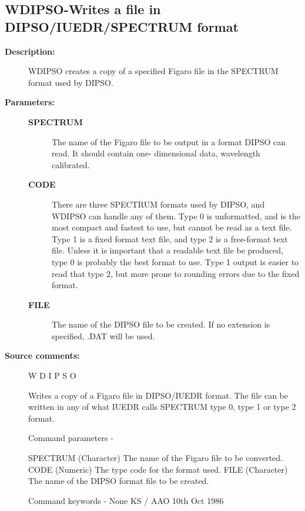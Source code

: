 \subsection{WDIPSO-\label{WDIPSO}Writes a file in DIPSO/IUEDR/SPECTRUM format}
\begin{description}

\item [\textbf{Description:}]
 WDIPSO creates a copy of a specified Figaro file in the SPECTRUM
 format used by DIPSO.

\item [\textbf{Parameters:}]
\begin{description}
\item [\textbf{SPECTRUM}]
 The name of the Figaro file to be output
 in a format DIPSO can read.  It should contain one-
 dimensional data, wavelength calibrated.
\item [\textbf{CODE}]
 There are three SPECTRUM formats used by DIPSO, and
 WDIPSO can handle any of them.  Type 0 is unformatted,
 and is the most compact and fastest to use, but cannot
 be read as a text file.  Type 1 is a fixed format text
 file, and type 2 is a free-format text file.  Unless it
 is important that a readable text file be produced, type
 0 is probably the best format to use.  Type 1 output is
 easier to read that type 2, but more prone to rounding
 errors due to the fixed format.
\item [\textbf{FILE}]
 The name of the DIPSO file to be created.
 If no extension is specified, .DAT will be used.
\end{description}

\item [\textbf{Source comments:}]
\begin{terminalv}
 W D I P S O

 Writes a copy of a Figaro file in DIPSO/IUEDR format.  The file
 can be written in any of what IUEDR calls SPECTRUM type 0, type 1
 or type 2 format.

 Command parameters -

 SPECTRUM  (Character) The name of the Figaro file to be converted.
 CODE      (Numeric) The type code for the format used.
 FILE      (Character) The name of the DIPSO format file to be
           created.

 Command keywords -  None
                                           KS / AAO 10th Oct 1986
\end{terminalv}
\end{description}
